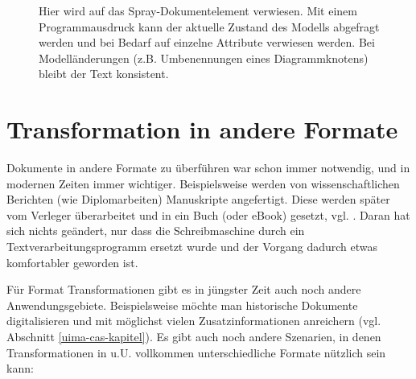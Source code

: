  
\begin{figure}[h!]
\centering
{}
\caption[Spray-Dokumentelement verweisen]{ Hier wird auf das Spray-Dokumentelement verwiesen. Mit einem Programmausdruck kann der aktuelle Zustand des Modells abgefragt werden und bei Bedarf auf einzelne Attribute verwiesen werden. Bei Modelländerungen (z.B. Umbenennungen eines Diagrammknotens) bleibt der Text konsistent. }\label{sprayreferenzieren}
\end{figure}
 
\section{Transformation in andere Formate}\label{transformation}
 
Dokumente in andere Formate zu überführen war schon immer notwendig, und in modernen Zeiten immer wichtiger. Beispielsweise werden von wissenschaftlichen Berichten (wie Diplomarbeiten) Manuskripte angefertigt. Diese werden später vom Verleger überarbeitet und in ein Buch (oder eBook) gesetzt, vgl. \citep{DIN1422-1}. Daran hat sich nichts geändert, nur dass die Schreibmaschine durch ein Textverarbeitungsprogramm ersetzt wurde und der Vorgang dadurch etwas komfortabler geworden ist.

 
Für Format Transformationen gibt es in jüngster Zeit auch noch andere Anwendungsgebiete. Beispielsweise möchte man historische Dokumente digitalisieren und mit möglichst vielen Zusatzinformationen anreichern (vgl. Abschnitt \ref{uima-cas-kapitel}). Es gibt auch noch andere Szenarien, in denen Transformationen in u.U. vollkommen unterschiedliche Formate nützlich sein kann:

